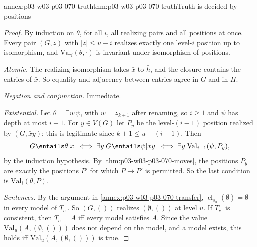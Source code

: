 \begin{annexitem}{annex:p03-w03-p03-070-truth}{thm:p03-w03-p03-070-truth}{Truth is decided by positions}
\begin{proof}
By induction on \(\theta\), for all \(i\), all realizing pairs and all
positions at once.  Every pair \((G,\bar z)\) with \(|\bar z|\leq u-i\)
realizes exactly one level-\(i\) position up to isomorphism, and
\(\mathrm{Val}_i(\theta,\cdot)\) is invariant under isomorphism of positions.

\emph{Atomic.}  The realizing isomorphism takes \(\bar x\) to \(\bar h\), and
the closure contains the entries of \(\bar x\).  So equality and adjacency
between entries agree in \(G\) and in \(H\).

\emph{Negation and conjunction.}  Immediate.

\emph{Existential.}  Let \(\theta=\exists w\,\psi\), with \(w=z_{k+1}\) after
renaming, so \(i\geq1\) and \(\psi\) has depth at most \(i-1\).  For \(y\in V(G)\)
let \(P_y\) be the level-\((i-1)\) position realized by \((G,\bar xy)\); this
is legitimate since \(k+1\leq u-(i-1)\).  Then
\[
 G\entails\theta[\bar x]\iff\exists y\;G\entails\psi[\bar xy]
 \iff\exists y\;\mathrm{Val}_{i-1}(\psi,P_y) ,
\]
by the induction hypothesis.  By \cref{thm:p03-w03-p03-070-moves}, the
positions \(P_y\) are exactly the positions \(P'\) for which \(P\to P'\) is
permitted.  So the last condition is \(\mathrm{Val}_i(\theta,P)\).

\emph{Sentences.}  By the argument in \cref{annex:p03-w03-p03-070-transfer},
\(\operatorname{cl}_{s_u}(\emptyset)=\emptyset\) in every model of
\(T^-_c\).  So \((G,())\) realizes \((\emptyset,())\) at level \(u\).  If
\(T^-_c\) is consistent, then \(T^-_c\vdash A\) iff every model satisfies
\(A\).  Since the value \(\mathrm{Val}_u(A,(\emptyset,()))\) does not depend on
the model, and a model exists, this holds iff \(\mathrm{Val}_u(A,(\emptyset,()))\)
is true.
\end{proof}
\end{annexitem}


